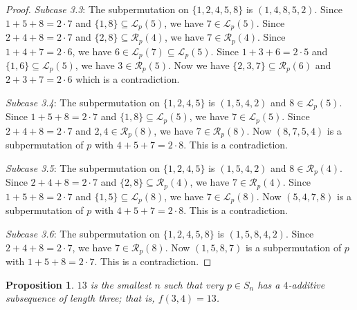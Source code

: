\documentclass[10pt,a4paper]{amsart}
\newtheorem{proposition}[theorem]{Proposition}
\begin{document}
\begin{proof}
\textit{Subcase 3.3}: The subpermutation on $\{1,2,4,5,8\}$ is $(1,4,8,5,2)$. Since $1+5+8=2\cdot7$ and $\{1,8\}\subseteq\mathcal{L}_p(5)$, we have $7\in\mathcal{L}_p(5)$. Since $2+4+8=2\cdot7$ and $\{2,8\}\subseteq\mathcal{R}_p(4)$, we have $7\in\mathcal{R}_p(4)$. Since $1+4+7=2\cdot6$, we have $6\in\mathcal{L}_p(7)\subseteq\mathcal{L}_p(5)$. Since $1+3+6=2\cdot5$ and $\{1,6\}\subseteq\mathcal{L}_p(5)$, we have $3\in\mathcal{R}_p(5)$. Now we have $\{2,3,7\}\subseteq\mathcal{R}_p(6)$ and $2+3+7=2\cdot6$ which is a contradiction.

\textit{Subcase 3.4}: The subpermutation on $\{1,2,4,5\}$ is $(1,5,4,2)$ and $8\in\mathcal{L}_p(5)$. Since $1+5+8=2\cdot7$ and $\{1,8\}\subseteq\mathcal{L}_p(5)$, we have $7\in\mathcal{L}_p(5)$. Since $2+4+8=2\cdot7$ and $2,4\in\mathcal{R}_p(8)$, we have $7\in\mathcal{R}_p(8)$. Now $(8,7,5,4)$ is a subpermutation of $p$ with $4+5+7=2\cdot8$. This is a contradiction.

\textit{Subcase 3.5}: The subpermutation on $\{1,2,4,5\}$ is $(1,5,4,2)$ and $8\in\mathcal{R}_p(4)$. Since $2+4+8=2\cdot7$ and $\{2,8\}\subseteq\mathcal{R}_p(4)$, we have $7\in\mathcal{R}_p(4)$. Since $1+5+8=2\cdot7$ and $\{1,5\}\subseteq\mathcal{L}_p(8)$, we have $7\in\mathcal{L}_p(8)$. Now $(5,4,7,8)$ is a subpermutation of $p$ with $4+5+7=2\cdot8$. This is a contradiction.

\textit{Subcase 3.6}: The subpermutation on $\{1,2,4,5,8\}$ is $(1,5,8,4,2)$. Since $2+4+8=2\cdot7$, we have $7\in\mathcal{R}_p(8)$. Now $(1,5,8,7)$ is a subpermutation of $p$ with $1+5+8=2\cdot7$. This is a contradiction.
\end{proof}    

\begin{proposition}
$13$ is the smallest $n$ such that very $p\in S_n$ has a $4$-additive subsequence of length three; that is, $f(3,4)=13$.
\end{proposition}
\end{document}
